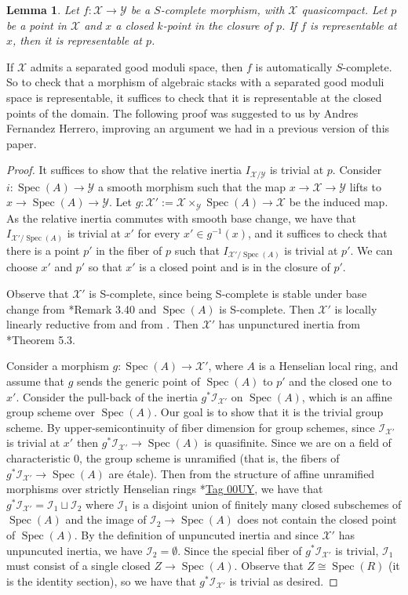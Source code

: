 \documentclass{amsart}
\newcommand{\cI}{\mathcal{I}}
\newcommand{\cX}{\mathcal{X}}
\newcommand{\cY}{\mathcal{Y}}
\newcommand{\spec}{\operatorname{Spec}}
\newtheorem{Lemma}[theorem]{Lemma}
\theoremstyle{definition}
\theoremstyle{definition}
\begin{document}
{\begin{Lemma}\label{lemma_one_can_check_rep_at_poli_pts}
    Let $f:\cX\to \cY$ be a $S$-complete morphism, with $\cX$ quasicompact. Let $p$ be a point in $\cX$ and $x$ a closed $k$-point in the closure of $p$. If $f$ is representable at $x$, then it is representable at $p$.
\end{Lemma}
If $\cX$ admits a separated good moduli space, then $f$ is automatically $S$-complete. So to check that a morphism of algebraic stacks with a separated good moduli space is representable, it suffices to check that it is representable at the closed points of the domain. The following proof was suggested to us by Andres Fernandez Herrero, improving an argument we had in a previous version of this paper.

\begin{proof}It suffices to show that the relative inertia $I_{\cX/\cY}$ is trivial at $p$. Consider $i:\spec(A)\to \cY$ a smooth morphism such that the map $x\to \cX\to \cY$ lifts to $x\to \spec(A)\to \cY$. Let $g\colon\cX':=\cX\times_{\cY}\spec(A) \to \cX$ be the induced map. As the relative inertia commutes with smooth base change, we have that $I_{\cX'/\spec(A)}$ is trivial at $x'$ for every $x'\in g^{-1}(x)$, and it suffices to check that there is a point $p'$ in the fiber of $p$ such that $I_{\cX'/\spec(A)}$ is trivial at $p'$. We can choose $x'$ and $p'$ so that $x'$ is a closed point and is in the closure of $p'$.  

Observe that $\cX'$ is S-complete, since being S-complete is stable under base change from \cite{AHH}*{Remark 3.40} and $\spec(A)$ is S-complete. Then $\cX'$ is locally linearly reductive from \cite{alper2019cartan} and from \cite{luna}. Then $\cX'$ has unpunctured inertia from \cite{AHH}*{Theorem 5.3}.

Consider a morphism $g:\spec(A)\to \cX'$, where $A$ is a Henselian local ring, and assume that $g$ sends the generic point of $\spec(A)$ to $p'$ and the closed one to $x'$. Consider the pull-back of the inertia $g^*\cI_{\cX'}$ on $\spec(A)$, which is an affine group scheme over $\spec(A)$. Our goal is to show that it is the trivial group scheme. By upper-semicontinuity of fiber dimension for group schemes, since $\cI_{\cX'}$ is trivial at $x'$ then $g^*\cI_{\cX'}\to \spec(A)$ is quasifinite. Since we are on a field of characteristic 0, the group
scheme is unramified (that is, the fibers of $g^*\cI_{\cX'}\to \spec(A)$ are \'etale). Then from the structure of affine unramified morphisms over strictly Henselian rings \cite{stacks-project}*{\href{https://stacks.math.columbia.edu/tag/00UY}{Tag 00UY}}, we have that $g^*\cI_{\cX'}=\cI_1\sqcup \cI_2$ where $\cI_1$ is a disjoint union of finitely many closed
subschemes of $\spec(A)$ and the image of $\cI_2\to \spec(A)$ does not contain the closed point of $\spec(A)$. By the definition of unpuncuted inertia and since $\cX'$ has unpuncuted inertia, we have $\cI_2=\emptyset$. Since the special fiber of $g^*\cI_{\cX'}$ is trivial, $\cI_1$ must consist of a single closed $Z \to \spec(A)$. Observe that $Z\cong \spec(R)$ (it is the identity section), so we have that $g^*\cI_{\cX'}$ is trivial as desired.
\end{proof}

}
\end{document}
